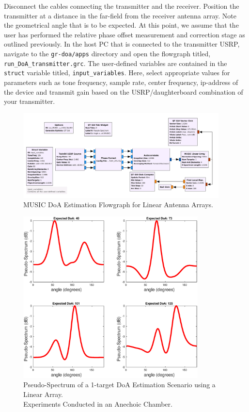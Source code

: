 \documentclass[a4paper, 11pt]{article}
\begin{document}
Disconnect the cables connecting the transmitter and the receiver. Position the transmitter at a distance in the far-field from the receiver antenna array. Note the geometrical angle that is to be expected. At this point, we assume that the user has performed the relative phase offset measurement and correction stage as outlined previously. In the host PC that is connected to the transmitter USRP, navigate to the \texttt{gr-doa/apps} directory and open the flowgraph titled, \texttt{run\_DoA\_transmitter.grc}. The user-defined variables are contained in the \texttt{struct} variable titled, \texttt{input\_variables}. Here, select appropriate values for parameters such as tone frequency, sample rate, center frequency, ip-address of the device and transmit gain based on the USRP/daughterboard combination of your transmitter. 
\begin{figure}[b!]
    \centering
    \includegraphics[width=0.95\textwidth]{figures/MUSIC_lin_flowgraph.png}
    \caption{MUSIC DoA Estimation Flowgraph for Linear Antenna Arrays.}
    \label{MUSIC_doa_est_lin}
\end{figure}
\begin{figure}[t!]
    \centering
    \includegraphics[width=0.85\textwidth]{figures/MUSIC_lin_array_X310_1target.eps}
    \caption{Pseudo-Spectrum of a 1-target DoA Estimation Scenario using a Linear Array.\\ Experiments Conducted in an Anechoic Chamber.}
    \label{music_x310}
\end{figure}
\end{document}
